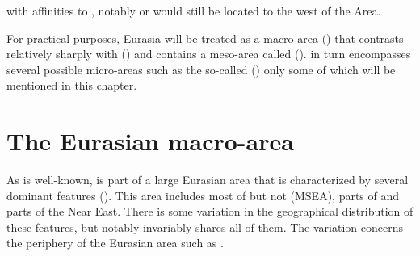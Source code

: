 with affinities to , notably  or  would still be located to the west of the  Area.

For practical purposes, Eurasia will be treated as a macro-area () that contrasts relatively sharply with  () and contains a meso-area called  ().  in turn encompasses several possible micro-areas such as the so-called \textit{} () only some of which will be mentioned in this chapter.

\section{The Eurasian macro-area}\label{sec:3.2}

As is well-known,  is part of a large Eurasian area that is characterized by several dominant features (). This area includes most of  but not  (MSEA), parts of  and parts of the Near East. There is some variation in the geographical distribution of these features, but notably  invariably shares all of them. The variation concerns the periphery of the Eurasian area such as .

